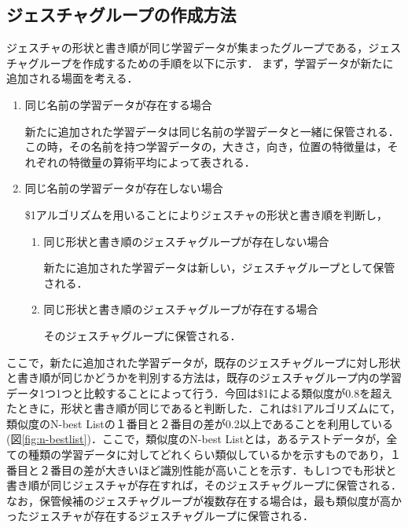 \subsection{ジェスチャグループの作成方法}
ジェスチャの形状と書き順が同じ学習データが集まったグループである，ジェスチャグループを作成するための手順を以下に示す．
まず，学習データが新たに追加される場面を考える．
\begin{enumerate}
\renewcommand{\labelenumi}{\Alph{enumi}.}
\item 同じ名前の学習データが存在する場合

新たに追加された学習データは同じ名前の学習データと一緒に保管される．この時，その名前を持つ学習データの，大きさ，向き，位置の特徴量は，それぞれの特徴量の算術平均によって表される．
 
\item 同じ名前の学習データが存在しない場合

\$1アルゴリズムを用いることによりジェスチャの形状と書き順を判断し，

\begin{enumerate}
\renewcommand{\labelenumi}{\alph{enumi}.}

\item 同じ形状と書き順のジェスチャグループが存在しない場合
 
新たに追加された学習データは新しい，ジェスチャグループとして保管される．
   
\item 同じ形状と書き順のジェスチャグループが存在する場合

そのジェスチャグループに保管される．

\end{enumerate}
\end{enumerate}

ここで，新たに追加された学習データが，既存のジェスチャグループに対し形状と書き順が同じかどうかを判別する方法は，既存のジェスチャグループ内の学習データ1つ1つと比較することによって行う．今回は\$1による類似度が0.8を超えたときに，形状と書き順が同じであると判断した．これは\$1アルゴリズムにて，類似度のN-best Listの１番目と２番目の差が0.2以上であることを利用している(図\ref{fig:n-bestlist})．ここで，類似度のN-best Listとは，あるテストデータが，全ての種類の学習データに対してどれくらい類似しているかを示すものであり，１番目と２番目の差が大きいほど識別性能が高いことを示す．もし1つでも形状と書き順が同じジェスチャが存在すれば，そのジェスチャグループに保管される．なお，保管候補のジェスチャグループが複数存在する場合は，最も類似度が高かったジェスチャが存在するジェスチャグループに保管される．


